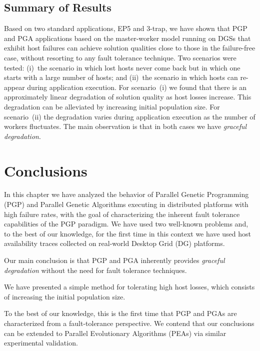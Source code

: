 \documentclass[graybox]{sty/svmult}
\begin{document}
\subsection{Summary of Results}
\label{summary}

Based on two standard applications, EP5 and 3-trap,  we have shown that
PGP and PGA applications based on the master-worker model running on DGSs
that exhibit host failures can achieve solution qualities close to
those in the failure-free case, without resorting to any fault
tolerance technique.  Two scenarios were tested: (i)~the scenario in
which lost hosts never come back but in which one starts with a large
number of hosts; and (ii)~the scenario in which hosts can re-appear
during application execution.  For scenario~(i) we found that there is
an approximately linear degradation of solution quality as host losses
increase. This degradation can be alleviated by increasing initial
population size.  For scenario~(ii) the degradation varies during
application execution as the number of workers fluctuates.  The main observation
is that in both cases we have \emph{graceful degradation}.

\section{Conclusions} 
\label{conclusions}
In this chapter we have analyzed the behavior of Parallel Genetic
Programming (PGP) and Parallel Genetic Algorithms executing in distributed platforms with
high failure rates, with the goal of characterizing the inherent fault
tolerance capabilities of the PGP paradigm.  We have used two well-known
problems and, to the best of our knowledge, for the first time in this
context we have used host availability traces collected on real-world
Desktop Grid (DG) platforms.

Our main conclusion is that PGP and PGA inherently provides \emph{graceful
degradation} without the need for fault tolerance techniques.

We have presented a simple method for tolerating high host losses,
which consists of increasing the initial population size. 

To the best of our knowledge, this is the first time that PGP and PGAs are
characterized from a fault-tolerance perspective.  We contend that our
conclusions can be extended to Parallel Evolutionary Algorithms (PEAs)
via similar experimental validation. 


\end{document}
